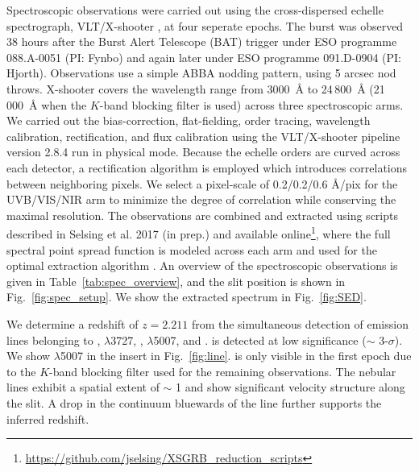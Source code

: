 \documentclass{aa}    %
\begin{document}
Spectroscopic observations were carried out using the cross-dispersed echelle
spectrograph, VLT/X-shooter \citep{Vernet2011}, at four seperate epochs. The
burst was observed 38 hours after the Burst Alert Telescope (BAT) trigger under
ESO programme 088.A-0051 (PI: Fynbo) and again later under ESO programme
091.D-0904 (PI: Hjorth). Observations use a simple ABBA nodding pattern, using 5
arcsec nod throws. X-shooter covers the wavelength range from 3000~\AA{} to
24\,800~\AA{} (21\,000~\AA{} when the $K$-band blocking filter is used) across three
spectroscopic arms. We carried out the bias-correction, flat-fielding, order
tracing, wavelength calibration, rectification, and flux calibration using the
VLT/X-shooter pipeline version 2.8.4 \citep{Goldoni2006, Modigliani2010} run in physical
mode. Because the echelle orders are curved across each detector, a
rectification algorithm is employed which introduces correlations between
neighboring pixels. We select a pixel-scale of 0.2/0.2/0.6 \AA/pix for the
UVB/VIS/NIR arm to minimize the degree of correlation while conserving the
maximal resolution. The observations are combined and extracted using scripts
described in Selsing et al. 2017 (in prep.) and available
online\footnote{\url{https://github.com/jselsing/XSGRB_reduction_scripts}},
where the full spectral point spread function is modeled across each arm and
used for the optimal extraction algorithm \citep{Horne1986}. An overview of the
spectroscopic observations is given in Table~\ref{tab:spec_overview}, and the
slit position is shown in Fig.~\ref{fig:spec_setup}. We show the extracted
spectrum in Fig.~\ref{fig:SED}.



We determine a redshift of $z = 2.211$ from the simultaneous detection of
emission lines belonging to \lya, \oii$\lambda$3727, \hb, \oiii$\lambda$5007,
and \ha. \hb{} is detected at low significance ($\sim$ 3-$\sigma$). We show
\oiii$\lambda$5007 in the insert in Fig.~\ref{fig:line}.  \ha{} is only visible in
the first epoch due to the $K$-band blocking filter used for the remaining
observations. The nebular lines exhibit a spatial extent of $\sim$ 1 and
show significant velocity structure along the slit. A drop in the continuum
bluewards of the \lya{} line further supports the inferred redshift.
\end{document}
